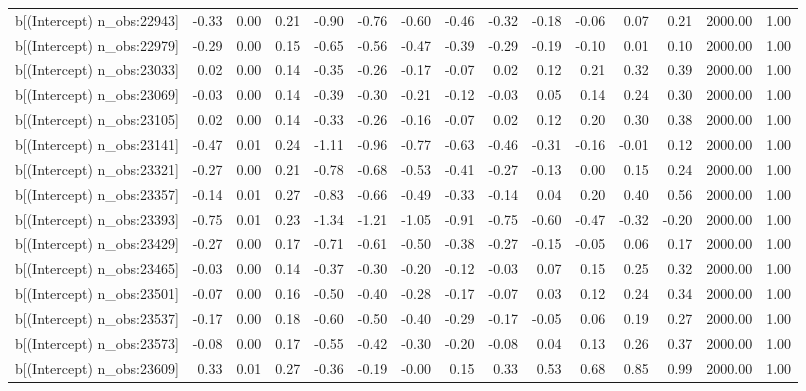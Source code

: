 \begin{table}[ht]
\begin{tabular}{rrrrrrrrrrrrrrr}
  b[(Intercept) n\_obs:22943] & -0.33 & 0.00 & 0.21 & -0.90 & -0.76 & -0.60 & -0.46 & -0.32 & -0.18 & -0.06 & 0.07 & 0.21 & 2000.00 & 1.00 \\ 
  b[(Intercept) n\_obs:22979] & -0.29 & 0.00 & 0.15 & -0.65 & -0.56 & -0.47 & -0.39 & -0.29 & -0.19 & -0.10 & 0.01 & 0.10 & 2000.00 & 1.00 \\ 
  b[(Intercept) n\_obs:23033] & 0.02 & 0.00 & 0.14 & -0.35 & -0.26 & -0.17 & -0.07 & 0.02 & 0.12 & 0.21 & 0.32 & 0.39 & 2000.00 & 1.00 \\ 
  b[(Intercept) n\_obs:23069] & -0.03 & 0.00 & 0.14 & -0.39 & -0.30 & -0.21 & -0.12 & -0.03 & 0.05 & 0.14 & 0.24 & 0.30 & 2000.00 & 1.00 \\ 
  b[(Intercept) n\_obs:23105] & 0.02 & 0.00 & 0.14 & -0.33 & -0.26 & -0.16 & -0.07 & 0.02 & 0.12 & 0.20 & 0.30 & 0.38 & 2000.00 & 1.00 \\ 
  b[(Intercept) n\_obs:23141] & -0.47 & 0.01 & 0.24 & -1.11 & -0.96 & -0.77 & -0.63 & -0.46 & -0.31 & -0.16 & -0.01 & 0.12 & 2000.00 & 1.00 \\ 
  b[(Intercept) n\_obs:23321] & -0.27 & 0.00 & 0.21 & -0.78 & -0.68 & -0.53 & -0.41 & -0.27 & -0.13 & 0.00 & 0.15 & 0.24 & 2000.00 & 1.00 \\ 
  b[(Intercept) n\_obs:23357] & -0.14 & 0.01 & 0.27 & -0.83 & -0.66 & -0.49 & -0.33 & -0.14 & 0.04 & 0.20 & 0.40 & 0.56 & 2000.00 & 1.00 \\ 
  b[(Intercept) n\_obs:23393] & -0.75 & 0.01 & 0.23 & -1.34 & -1.21 & -1.05 & -0.91 & -0.75 & -0.60 & -0.47 & -0.32 & -0.20 & 2000.00 & 1.00 \\ 
  b[(Intercept) n\_obs:23429] & -0.27 & 0.00 & 0.17 & -0.71 & -0.61 & -0.50 & -0.38 & -0.27 & -0.15 & -0.05 & 0.06 & 0.17 & 2000.00 & 1.00 \\ 
  b[(Intercept) n\_obs:23465] & -0.03 & 0.00 & 0.14 & -0.37 & -0.30 & -0.20 & -0.12 & -0.03 & 0.07 & 0.15 & 0.25 & 0.32 & 2000.00 & 1.00 \\ 
  b[(Intercept) n\_obs:23501] & -0.07 & 0.00 & 0.16 & -0.50 & -0.40 & -0.28 & -0.17 & -0.07 & 0.03 & 0.12 & 0.24 & 0.34 & 2000.00 & 1.00 \\ 
  b[(Intercept) n\_obs:23537] & -0.17 & 0.00 & 0.18 & -0.60 & -0.50 & -0.40 & -0.29 & -0.17 & -0.05 & 0.06 & 0.19 & 0.27 & 2000.00 & 1.00 \\ 
  b[(Intercept) n\_obs:23573] & -0.08 & 0.00 & 0.17 & -0.55 & -0.42 & -0.30 & -0.20 & -0.08 & 0.04 & 0.13 & 0.26 & 0.37 & 2000.00 & 1.00 \\ 
  b[(Intercept) n\_obs:23609] & 0.33 & 0.01 & 0.27 & -0.36 & -0.19 & -0.00 & 0.15 & 0.33 & 0.53 & 0.68 & 0.85 & 0.99 & 2000.00 & 1.00 \\ 

\end{tabular}
\end{table}
